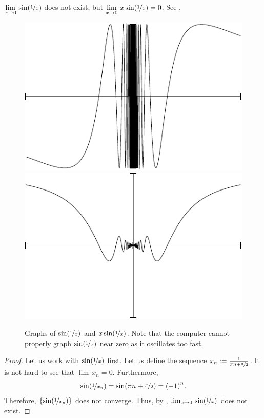 \documentclass[12pt]{book}
\begin{document}
\begin{example}
$\displaystyle \lim_{x \to 0} \, \sin( \nicefrac{1}{x} )$
does not exist, but 
$\displaystyle \lim_{x \to 0} \, x\sin( \nicefrac{1}{x} ) = 0$.
See .

\begin{figure}[h!t]
\begin{center}
\includegraphics{sin1xfig}
\qquad
\includegraphics{xsin1xfig}
\caption{Graphs of $\sin(\nicefrac{1}{x})$ and $x \sin(\nicefrac{1}{x})$.
Note that the computer cannot properly graph $\sin(\nicefrac{1}{x})$
near zero as it oscillates too fast.\label{figsin1x}}
\end{center}
\end{figure}

\begin{proof}
Let us work with $\sin(\nicefrac{1}{x})$ first.
Let us define the sequence
$x_n := \frac{1}{\pi n + \nicefrac{\pi}{2}}$.
It is not hard to see
that $\lim\, x_n = 0$.
Furthermore,
\begin{equation*}
\sin ( \nicefrac{1}{x_n} )
=
\sin (\pi n + \nicefrac{\pi}{2})
= {(-1)}^n .
\end{equation*}
Therefore, $\{ \sin ( \nicefrac{1}{x_n} ) \}$ does not converge.
Thus, by
, 
$\lim_{x \to 0} \, \sin( \nicefrac{1}{x} )$ does not exist.


\end{proof}
\end{example}
\end{document}
